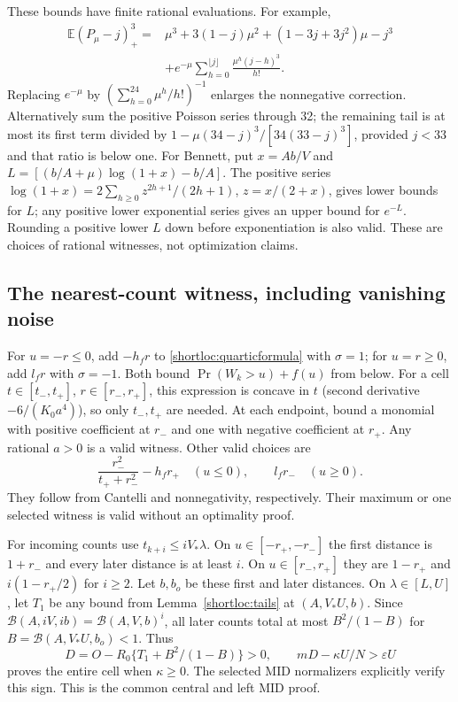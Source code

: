 These bounds have finite rational evaluations. For example,
\begin{align}\label{shortloc:poissonfinite}
 \mathbb E(P_\mu-j)_+^3={}&\mu^3+3(1-j)\mu^2+(1-3j+3j^2)\mu-j^3\\
 &+e^{-\mu}\sum_{h=0}^{\lfloor j\rfloor}\frac{\mu^h(j-h)^3}{h!}.\nonumber
\end{align}
Replacing $e^{-\mu}$ by $(\sum_{h=0}^{24}\mu^h/h!)^{-1}$ enlarges the
nonnegative correction. Alternatively sum the positive Poisson series
through 32; the remaining tail is at most its first term divided by
$1-\mu(34-j)^3/[34(33-j)^3]$, provided $j<33$ and that ratio is below one.
For Bennett, put $x=Ab/V$ and
$L=[(b/A+\mu)\log(1+x)-b/A]$. The positive series
$\log(1+x)=2\sum_{h\ge0}z^{2h+1}/(2h+1)$, $z=x/(2+x)$, gives lower
bounds for $L$; any positive lower exponential series gives an upper bound
for $e^{-L}$. Rounding a positive lower $L$ down before exponentiation is
also valid. These are choices of rational witnesses, not optimization claims.

\subsection{The nearest-count witness, including vanishing noise}

For $u=-r\le0$, add $-h_fr$ to \eqref{shortloc:quarticformula} with
$\sigma=1$; for $u=r\ge0$, add $l_fr$ with $\sigma=-1$.
Both bound $\Pr(W_k>u)+f(u)$ from below. For a cell
$t\in[t_-,t_+]$, $r\in[r_-,r_+]$, this expression is concave in $t$
(second derivative $-6/(K_0a^4)$), so only $t_-,t_+$ are needed.
At each endpoint, bound a monomial with positive coefficient at $r_-$
and one with negative coefficient at $r_+$. Any rational $a>0$ is a valid
witness. Other valid choices are
\begin{equation}\label{shortloc:ownother}
 \frac{r_-^2}{t_++r_-^2}-h_fr_+\quad(u\le0),\qquad l_fr_-\quad(u\ge0).
\end{equation}
They follow from Cantelli and nonnegativity, respectively. Their maximum
or one selected witness is valid without an optimality proof.

For incoming counts use $t_{k+i}\le iV_*\lambda$. On $u\in[-r_+,-r_-]$
the first distance is $1+r_-$ and every later distance is at least $i$.
On $u\in[r_-,r_+]$ they are $1-r_+$ and $i(1-r_+/2)$ for $i\ge2$.
Let $b,b_o$ be these first and later distances. On $\lambda\in[L,U]$,
let $T_1$ be any bound from Lemma~\ref{shortloc:tails} at $(A,V_*U,b)$.
Since $\mathcal B(A,iV,ib)=\mathcal B(A,V,b)^i$, all later counts total at most
$B^2/(1-B)$ for $B=\mathcal B(A,V_*U,b_o)<1$. Thus
\begin{equation}\label{shortloc:midtest}
 D=O-R_0\{T_1+B^2/(1-B)\}>0,\qquad
 mD-\kappa U/N>\varepsilon U
\end{equation}
proves the entire cell when $\kappa\ge0$. The selected MID normalizers
explicitly verify this sign. This is the common central and left MID proof.

